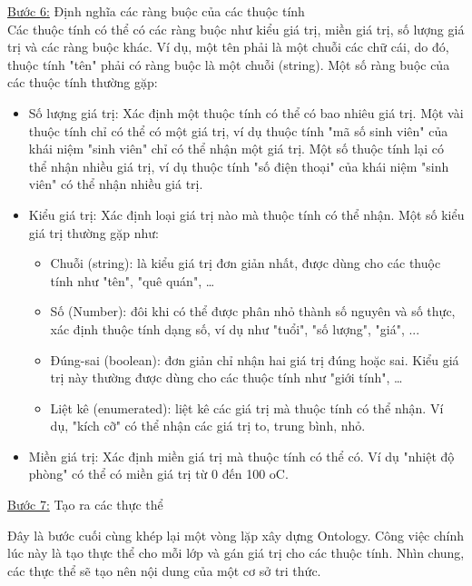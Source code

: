 \underline{Bước 6:} Định nghĩa các ràng buộc của các thuộc tính \\
Các thuộc tính có thể có các ràng buộc như kiểu giá trị, miền giá trị, số lượng giá trị và các ràng buộc khác. Ví dụ, một tên phải là một chuỗi các chữ cái, do đó, thuộc tính "tên" phải có ràng buộc là một chuỗi (string). 
Một số ràng buộc của các thuộc tính thường gặp:
\begin{itemize}
	\item Số lượng giá trị: Xác định một thuộc tính có thể có bao nhiêu giá trị. Một vài thuộc tính chỉ có thể có một giá trị, ví dụ thuộc tính "mã số sinh viên" của khái niệm "sinh viên" chỉ có thể nhận một giá trị. Một số thuộc tính lại có thể nhận nhiều giá trị, ví dụ thuộc tính "số điện thoại" của khái niệm "sinh viên" có thể nhận nhiều giá trị.
	\item Kiểu giá trị: Xác định loại giá trị nào mà thuộc tính có thể nhận. Một số kiểu giá trị thường gặp như:
	\begin{itemize}
		\item Chuỗi (string): là kiểu giá trị đơn giản nhất, được dùng cho các thuộc tính như "tên", "quê quán", …
		\item Số (Number): đôi khi có thể được phân nhỏ thành số nguyên và số thực, xác định thuộc tính dạng số, ví dụ như "tuổi", "số lượng", "giá", ...
		\item Đúng-sai (boolean): đơn giản chỉ nhận hai giá trị đúng hoặc sai. Kiểu giá trị này thường được dùng cho các thuộc tính như "giới tính", …
		\item Liệt kê (enumerated): liệt kê các giá trị mà thuộc tính có thể nhận. Ví dụ, "kích cỡ" có thể nhận các giá trị to, trung bình, nhỏ.
	\end{itemize}
	\item Miền giá trị: Xác định miền giá trị mà thuộc tính có thể có. Ví dụ "nhiệt độ phòng" có thể có miền giá trị từ 0 đến 100 oC.  
\end{itemize}

\underline{Bước 7:} Tạo ra các thực thể
 
Đây là bước cuối cùng khép lại một vòng lặp xây dựng Ontology. Công việc chính lúc này là tạo thực thể cho mỗi lớp và gán giá trị cho các thuộc tính. Nhìn chung, các thực thể sẽ tạo nên nội dung của một cơ sở tri thức. 


